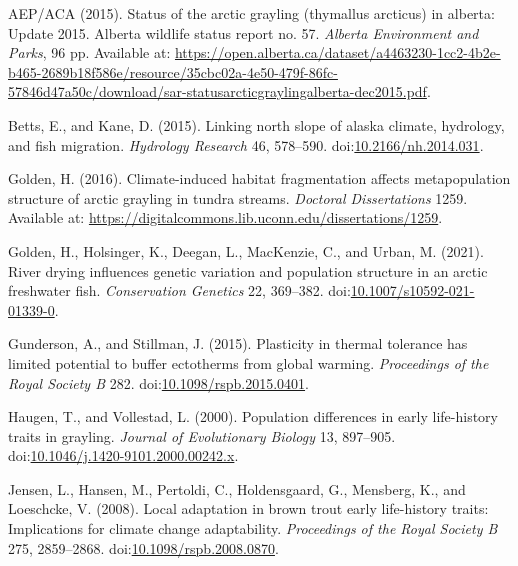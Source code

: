 \documentclass[utf8]{frontiersSCNS}
\newlength{\cslhangindent}
\newlength{\cslentryspacingunit} %
\newenvironment{CSLReferences}[2] %
 {%
  \setlength{\parindent}{0pt}
  \ifodd #1
  \let\oldpar\par
  \def\par{\hangindent=\cslhangindent\oldpar}
  \fi
  \setlength{\parskip}{#2\cslentryspacingunit}
 }%
 {}
\begin{document}
\hypertarget{refs}{}
\begin{CSLReferences}{1}{0}
\leavevmode{}%
AEP/ACA (2015). Status of the arctic grayling (thymallus arcticus) in
alberta: Update 2015. Alberta wildlife status report no. 57.
\emph{Alberta Environment and Parks}, 96 pp. Available at:
\url{https://open.alberta.ca/dataset/a4463230-1cc2-4b2e-b465-2689b18f586e/resource/35cbc02a-4e50-479f-86fc-57846d47a50c/download/sar-statusarcticgraylingalberta-dec2015.pdf}.

\leavevmode{}%
Betts, E., and Kane, D. (2015). Linking north slope of alaska climate,
hydrology, and fish migration. \emph{Hydrology Research} 46, 578--590.
doi:\href{https://doi.org/10.2166/nh.2014.031}{10.2166/nh.2014.031}.

\leavevmode{}%
Golden, H. (2016). Climate-induced habitat fragmentation affects
metapopulation structure of arctic grayling in tundra streams.
\emph{Doctoral Dissertations} 1259. Available at:
\url{https://digitalcommons.lib.uconn.edu/dissertations/1259}.

\leavevmode{}%
Golden, H., Holsinger, K., Deegan, L., MacKenzie, C., and Urban, M.
(2021). River drying influences genetic variation and population
structure in an arctic freshwater fish. \emph{Conservation Genetics} 22,
369--382.
doi:\href{https://doi.org/10.1007/s10592-021-01339-0}{10.1007/s10592-021-01339-0}.

\leavevmode{}%
Gunderson, A., and Stillman, J. (2015). Plasticity in thermal tolerance
has limited potential to buffer ectotherms from global warming.
\emph{Proceedings of the Royal Society B} 282.
doi:\href{https://doi.org/10.1098/rspb.2015.0401}{10.1098/rspb.2015.0401}.

\leavevmode{}%
Haugen, T., and Vollestad, L. (2000). Population differences in early
life-history traits in grayling. \emph{Journal of Evolutionary Biology}
13, 897--905.
doi:\href{https://doi.org/10.1046/j.1420-9101.2000.00242.x}{10.1046/j.1420-9101.2000.00242.x}.

\leavevmode{}%
Jensen, L., Hansen, M., Pertoldi, C., Holdensgaard, G., Mensberg, K.,
and Loeschcke, V. (2008). Local adaptation in brown trout early
life-history traits: Implications for climate change adaptability.
\emph{Proceedings of the Royal Society B} 275, 2859--2868.
doi:\href{https://doi.org/10.1098/rspb.2008.0870}{10.1098/rspb.2008.0870}.


\end{CSLReferences}
\end{document}
